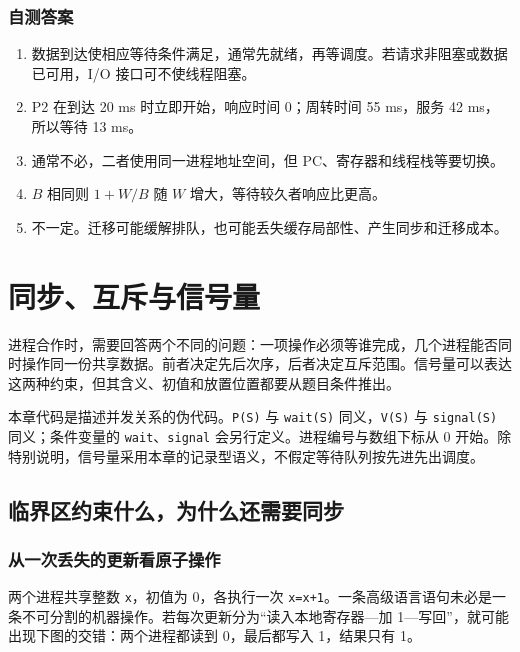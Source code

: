 \subsection{自测答案}\label{os-c02-h297}

\begin{enumerate}
\def\labelenumi{\arabic{enumi}.}
\tightlist
\item
  数据到达使相应等待条件满足，通常先就绪，再等调度。若请求非阻塞或数据已可用，I/O 接口可不使线程阻塞。
\item
  P2 在到达 20 ms 时立即开始，响应时间 0；周转时间 55 ms，服务 42 ms，所以等待 13 ms。
\item
  通常不必，二者使用同一进程地址空间，但 PC、寄存器和线程栈等要切换。
\item
  \(B\) 相同则 \(1+W/B\) 随 \(W\) 增大，等待较久者响应比更高。
\item
  不一定。迁移可能缓解排队，也可能丢失缓存局部性、产生同步和迁移成本。
\end{enumerate}

\chapter{同步、互斥与信号量}\label{ch-sync}

进程合作时，需要回答两个不同的问题：一项操作必须等谁完成，几个进程能否同时操作同一份共享数据。前者决定先后次序，后者决定互斥范围。信号量可以表达这两种约束，但其含义、初值和放置位置都要从题目条件推出。

本章代码是描述并发关系的伪代码。\texttt{P(S)} 与 \texttt{wait(S)} 同义，\texttt{V(S)} 与 \texttt{signal(S)} 同义；条件变量的 \texttt{wait}、\texttt{signal} 会另行定义。进程编号与数组下标从 0 开始。除特别说明，信号量采用本章的记录型语义，不假定等待队列按先进先出调度。

\section{临界区约束什么，为什么还需要同步}\label{sec-concepts}

\subsection{从一次丢失的更新看原子操作}\label{os-c03-h9}

两个进程共享整数 \texttt{x}，初值为 0，各执行一次 \texttt{x=x+1}。一条高级语言语句未必是一条不可分割的机器操作。若每次更新分为``读入本地寄存器---加 1---写回''，就可能出现下图的交错：两个进程都读到 0，最后都写入 1，结果只有 1。

